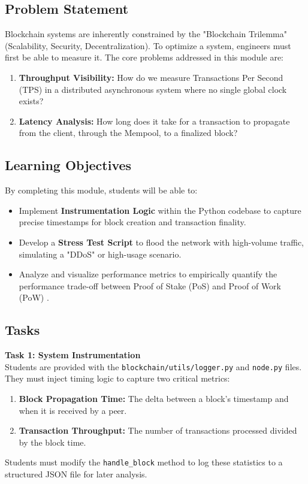 \subsection{Problem Statement}
Blockchain systems are inherently constrained by the "Blockchain Trilemma" (Scalability, Security, Decentralization). To optimize a system, engineers must first be able to measure it. The core problems addressed in this module are:
\begin{enumerate}
    \item \textbf{Throughput Visibility:} How do we measure Transactions Per Second (TPS) in a distributed asynchronous system where no single global clock exists?
    \item \textbf{Latency Analysis:} How long does it take for a transaction to propagate from the client, through the Mempool, to a finalized block?
\end{enumerate}

\subsection{Learning Objectives}
By completing this module, students will be able to:
\begin{itemize}
    \item Implement \textbf{Instrumentation Logic} within the Python codebase to capture precise timestamps for block creation and transaction finality.
    \item Develop a \textbf{Stress Test Script} to flood the network with high-volume traffic, simulating a "DDoS" or high-usage scenario.
    \item Analyze and visualize performance metrics to empirically quantify the performance trade-off between Proof of Stake (PoS) and Proof of Work (PoW) \cite{croman2016scaling}.
\end{itemize}

\subsection{Tasks}

\textbf{Task 1: System Instrumentation} \\
Students are provided with the \texttt{blockchain/utils/logger.py} and \texttt{node.py} files. They must inject timing logic to capture two critical metrics:
\begin{enumerate}
    \item \textbf{Block Propagation Time:} The delta between a block's timestamp and when it is received by a peer.
    \item \textbf{Transaction Throughput:} The number of transactions processed divided by the block time.
\end{enumerate}
Students must modify the \texttt{handle\_block} method to log these statistics to a structured JSON file for later analysis.

